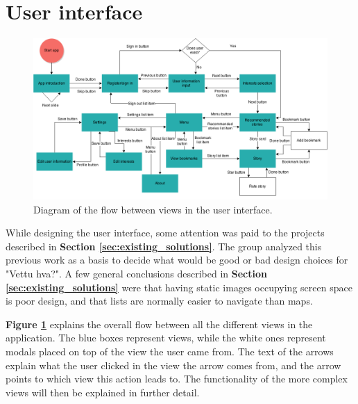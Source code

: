\section{User interface}


\begin{figure}[h!]
	\centering
	\includegraphics[width=\textwidth]{fig/flow_diagram}
	\caption{Diagram of the flow between views in the user interface.}
	\label{Fig:flow_diagram}
\end{figure}

While designing the user interface, some attention was paid to the projects described in \textbf{Section \ref{sec:existing_solutions}}. The group analyzed this previous work as a basis to decide what would be good or bad design choices for "Vettu hva?". A few general conclusions described in \textbf{Section \ref{sec:existing_solutions}} were that having static images occupying screen space is poor design, and that lists are normally easier to navigate than maps.\newline

\textbf{Figure \ref{Fig:flow_diagram}} explains the overall flow between all the different views in the application. The blue boxes represent views, while the white ones represent modals placed on top of the view the user came from. The text of the arrows explain what the user clicked in the view the arrow comes from, and the arrow points to which view this action leads to.  The functionality of the more complex views will then be explained in further detail.



